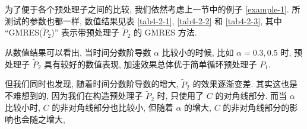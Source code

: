\documentclass{ecnumaster}
\begin{document}
为了便于各个预处理子之间的比较, 我们依然考虑上一节中的例子 \ref{example-1}.
所测试的参数也都一样, 数值结果见表 \ref{tab4-2-1}, \ref{tab4-2-2} 和 \ref{tab4-2-3},
其中 “GMRES($\tilde{P}_2$)” 表示带预处理子 $\tilde{P}_2$ 的 GMRES 方法.

%
%


从数值结果可以看出, 当时间分数阶导数 $\alpha$ 比较小的时候,
比如 $\alpha = 0.3, 0.5$ 时,
预处理子 $\tilde{P}_2$ 具有较好的数值表现,
加速效果总体优于简单循环预处理子 $P_1$.

但我们同时也发现, 随着时间分数阶导数的增大,
$\tilde{P}_2$ 的效果逐渐变差.
其实这也是不难想到的, 因为我们在构造预处理子 $\tilde P_2$ 时,
只使用了 $C$ 的对角线部分.
而当 $\alpha$ 比较小时, $C$ 的非对角线部分也比较小,
但随着 $\alpha$ 的增大, $C$ 的非对角线部分的影响也会随之增大,
%
\end{document}
